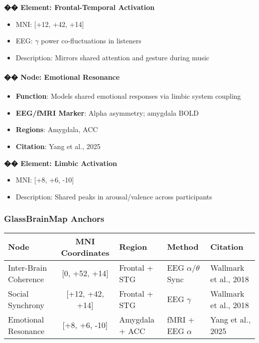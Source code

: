 \documentclass[10pt]{article}
\begin{document}
\textbf{�� Element: Frontal-Temporal Activation}

\begin{itemize}
    \item MNI: [+12, +42, +14]
    \item EEG: $\gamma$ power co-fluctuations in listeners
    \item Description: Mirrors shared attention and gesture during music
\end{itemize}

\paragraph{�� Node: Emotional Resonance}

\begin{itemize}
    \item \textbf{Function}: Models shared emotional responses via limbic system coupling
    \item \textbf{EEG/fMRI Marker}: Alpha asymmetry; amygdala BOLD
    \item \textbf{Regions}: Amygdala, ACC
    \item \textbf{Citation}: Yang et al., 2025
\end{itemize}

\textbf{�� Element: Limbic Activation}

\begin{itemize}
    \item MNI: [+8, +6, -10]
    \item Description: Shared peaks in arousal/valence across participants
\end{itemize}

\subsubsection*{GlassBrainMap Anchors}

\begin{center}
\begin{tabular}{|l|c|l|l|l|}
\hline
\textbf{Node} & \textbf{MNI Coordinates} & \textbf{Region} & \textbf{Method} & \textbf{Citation} \\
\hline
Inter-Brain Coherence & [0, +52, +14] & Frontal + STG & EEG $\alpha$/$\theta$ Sync & Wallmark et al., 2018 \\
Social Synchrony & [+12, +42, +14] & Frontal + STG & EEG $\gamma$ & Wallmark et al., 2018 \\
Emotional Resonance & [+8, +6, -10] & Amygdala + ACC & fMRI + EEG $\alpha$ & Yang et al., 2025 \\
\hline
\end{tabular}
\end{center}
\end{document}
